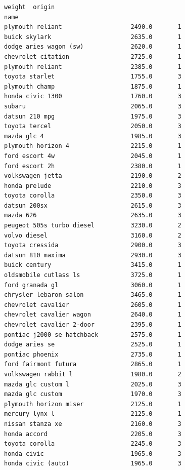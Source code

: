 \documentclass[11pt]{article}
\makeatletter
\newcommand{\boxspacing}{\kern\kvtcb@left@rule\kern\kvtcb@boxsep}
\newcommand{\prompt}[4]{
        {\ttfamily\llap{{\color{#2}[#3]:\hspace{3pt}#4}}\vspace{-\baselineskip}}
    }
\makeatother
\begin{document}
            \begin{tcolorbox}[breakable, size=fbox, boxrule=.5pt, pad at break*=1mm, opacityfill=0]
\prompt{Out}{outcolor}{94}{\boxspacing}
\begin{Verbatim}[commandchars=\\\{\}]
                                   weight  origin
name
plymouth reliant                   2490.0       1
buick skylark                      2635.0       1
dodge aries wagon (sw)             2620.0       1
chevrolet citation                 2725.0       1
plymouth reliant                   2385.0       1
toyota starlet                     1755.0       3
plymouth champ                     1875.0       1
honda civic 1300                   1760.0       3
subaru                             2065.0       3
datsun 210 mpg                     1975.0       3
toyota tercel                      2050.0       3
mazda glc 4                        1985.0       3
plymouth horizon 4                 2215.0       1
ford escort 4w                     2045.0       1
ford escort 2h                     2380.0       1
volkswagen jetta                   2190.0       2
honda prelude                      2210.0       3
toyota corolla                     2350.0       3
datsun 200sx                       2615.0       3
mazda 626                          2635.0       3
peugeot 505s turbo diesel          3230.0       2
volvo diesel                       3160.0       2
toyota cressida                    2900.0       3
datsun 810 maxima                  2930.0       3
buick century                      3415.0       1
oldsmobile cutlass ls              3725.0       1
ford granada gl                    3060.0       1
chrysler lebaron salon             3465.0       1
chevrolet cavalier                 2605.0       1
chevrolet cavalier wagon           2640.0       1
chevrolet cavalier 2-door          2395.0       1
pontiac j2000 se hatchback         2575.0       1
dodge aries se                     2525.0       1
pontiac phoenix                    2735.0       1
ford fairmont futura               2865.0       1
volkswagen rabbit l                1980.0       2
mazda glc custom l                 2025.0       3
mazda glc custom                   1970.0       3
plymouth horizon miser             2125.0       1
mercury lynx l                     2125.0       1
nissan stanza xe                   2160.0       3
honda accord                       2205.0       3
toyota corolla                     2245.0       3
honda civic                        1965.0       3
honda civic (auto)                 1965.0       3

\end{Verbatim}
\end{tcolorbox}
\end{document}

